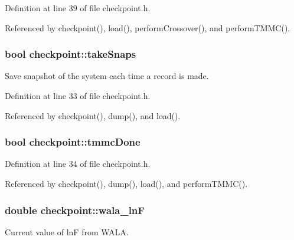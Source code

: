 Definition at line 39 of file checkpoint.\-h.



Referenced by checkpoint(), load(), perform\-Crossover(), and perform\-T\-M\-M\-C().

\hypertarget{classcheckpoint_a685226e8bae8084937f73f65c326c362}{
\subsubsection[{take\-Snaps}]{\setlength{\rightskip}{0pt plus 5cm}bool checkpoint\-::take\-Snaps}}\label{classcheckpoint_a685226e8bae8084937f73f65c326c362}


Save snapshot of the system each time a record is made. 



Definition at line 33 of file checkpoint.\-h.



Referenced by checkpoint(), dump(), and load().

\hypertarget{classcheckpoint_acbe0c62aa82735741a9f396827966823}{
\subsubsection[{tmmc\-Done}]{\setlength{\rightskip}{0pt plus 5cm}bool checkpoint\-::tmmc\-Done}}\label{classcheckpoint_acbe0c62aa82735741a9f396827966823}


Definition at line 34 of file checkpoint.\-h.



Referenced by checkpoint(), dump(), load(), and perform\-T\-M\-M\-C().

\hypertarget{classcheckpoint_a34dc9c1711a8b4f9986a7a2c41b9dcd1}{
\subsubsection[{wala\-\_\-ln\-F}]{\setlength{\rightskip}{0pt plus 5cm}double checkpoint\-::wala\-\_\-ln\-F}}\label{classcheckpoint_a34dc9c1711a8b4f9986a7a2c41b9dcd1}


Current value of ln\-F from W\-A\-L\-A. 



